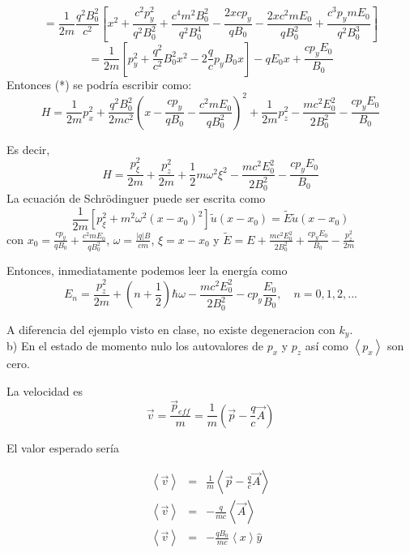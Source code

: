 \begin{solution}
\begin{equation*}
=\frac{1}{2m}\frac{q^2B_0^2}{c^2}\left[ x^2+\frac{c^2p_y^2}{q^2B_0^2}+\frac{c^4m^2B_0^2}{q^2B_0^4}-\frac{2xcp_y}{qB_0}-\frac{2xc^2mE_0}{qB_0^2}+\frac{c^3p_ymE_0}{q^2B_0^3}\right] 
\end{equation*}
\begin{equation*}
=\frac{1}{2m}\left[ p_y^2+\frac{q^2}{c^2}B_0^2x^2-2\frac{q}{c}p_yB_0x\right]-qE_0x+\frac{cp_yE_0}{B_0}
\end{equation*}
Entonces  (*) se podría escribir como:
\begin{equation*}
H=\frac{1}{2m}p_x^2+\frac{q^2B_0^2}{2mc^2}\left( x-\frac{cp_y}{qB_0}-\frac{c^2mE_0}{qB_0^2}\right)^2+\frac{1}{2m}p_z^2-\frac{mc^2E_0^2}{2B_0^2}-\frac{cp_yE_0}{B_0}
\end{equation*}

Es decir,
\begin{equation*}
H=\frac{p_\xi^2}{2m}+\frac{p_z^2}{2m}+\frac{1}{2}m\omega^2\xi^2-\frac{mc^2E_0^2}{2B_0^2}-\frac{cp_yE_0}{B_0}
\end{equation*}
La ecuación de Schrödinguer puede ser escrita como
\begin{equation*}
\frac{1}{2m}[p_\xi^2+m^2\omega^2(x-x_0)^2]\tilde{u}(x-x_0)=\tilde{E} \tilde{u}(x-x_0)
\end{equation*}
con $x_0=\frac{cp_y}{qB_0}+\frac{c^2mE_0}{qB_0^2}$, $\omega=\frac{ \left | q \right |  B }{cm}$, $\xi=x-x_0$ y $\tilde{E}=E+\frac{mc^2E_0^2}{2B_0^2}+\frac{cp_yE_0}{B_0}-\frac{p_z^2}{2m}$

Entonces, inmediatamente podemos leer la energía como
\begin{equation*}
E_n=\frac{p_z^2}{2m}+\left( n+\frac{1}{2}\right)\hbar\omega-\frac{mc^2E_0^2}{2B_0^2}-cp_y\frac{E_0}{B_0}, \quad n=0, 1, 2, ...
\end{equation*}

A diferencia del ejemplo visto en clase, no existe degeneracion con $k_y$.\\

b) En el estado de momento nulo los autovalores de $p_{x}$ y $p_{z}$ así como $\left\langle p_{x}\right\rangle $ son cero.

La velocidad es
\[
\vec{v}=\frac{\vec{p}_{eff}}{m}=\frac{1}{m}\left( \vec{p}-\frac{q}{c}\vec{A}\right) 
\]

El valor esperado sería

\begin{eqnarray*}
\left\langle \vec{v}\right\rangle  & = & \frac{1}{m}\left\langle \vec{p}-\frac{q}{c}\vec{A}\right\rangle \\
\left\langle \vec{v}\right\rangle  & = & -\frac{q}{mc}\left\langle \vec{A}\right\rangle \\
\left\langle \vec{v}\right\rangle  & = & -\frac{qB_{0}}{mc}\left\langle x\right\rangle \hat{y}
\end{eqnarray*}


\end{solution}
